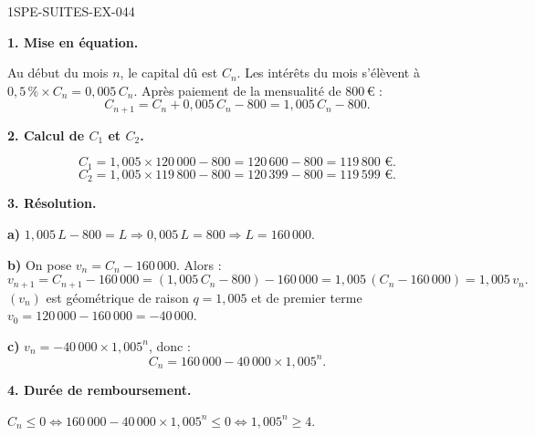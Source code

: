 \begin{corrige}{1SPE-SUITES-EX-044}

\textbf{1. Mise en équation.}

Au début du mois $n$, le capital dû est $C_n$. Les intérêts du mois s'élèvent à $0{,}5\,\% \times C_n = 0{,}005\,C_n$. Après paiement de la mensualité de $800$\,€ :
\[
C_{n+1} = C_n + 0{,}005\,C_n - 800 = 1{,}005\,C_n - 800.
\]

\textbf{2. Calcul de $C_1$ et $C_2$.}

\[
C_1 = 1{,}005 \times 120\,000 - 800 = 120\,600 - 800 = 119\,800 \text{ €}.
\]
\[
C_2 = 1{,}005 \times 119\,800 - 800 = 120\,399 - 800 = 119\,599 \text{ €}.
\]

\textbf{3. Résolution.}


\textbf{a)} $1{,}005\,L - 800 = L \Rightarrow 0{,}005\,L = 800 \Rightarrow L = 160\,000$.

\textbf{b)} On pose $v_n = C_n - 160\,000$. Alors :
\[
v_{n+1} = C_{n+1} - 160\,000 = (1{,}005\,C_n - 800) - 160\,000 = 1{,}005\,(C_n - 160\,000) = 1{,}005\,v_n.
\]
$(v_n)$ est géométrique de raison $q = 1{,}005$ et de premier terme $v_0 = 120\,000 - 160\,000 = -40\,000$.

\textbf{c)} $v_n = -40\,000 \times 1{,}005^n$, donc :
\[
\boxed{C_n = 160\,000 - 40\,000 \times 1{,}005^n}.
\]

\textbf{4. Durée de remboursement.}


$C_n \leq 0 \Leftrightarrow 160\,000 - 40\,000 \times 1{,}005^n \leq 0 \Leftrightarrow 1{,}005^n \geq 4$.


\end{corrige}
